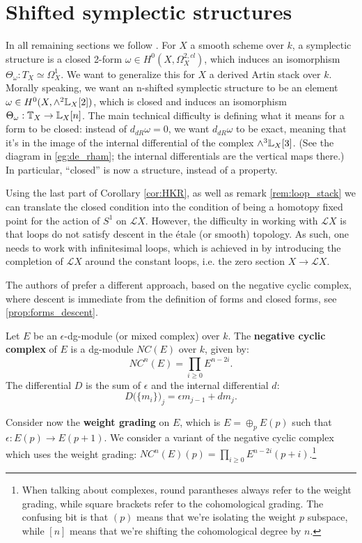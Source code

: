 \section{Shifted symplectic structures}
In all remaining sections we follow \cite{PTVV}. For $X$ a smooth scheme over $k$, a symplectic structure is a closed
2-form
$\omega \in H^0(X,\Omega^{2,cl}_X)$, which induces an isomorphism $\Theta_\omega : T_X \simeq \Omega^1_X$. We want to
generalize this for $X$ a derived Artin stack over $k$. Morally speaking, we want an n-shifted symplectic structure
to be an element $\omega \in H^0(X,\wedge^2\mathbb L_X [2])$, which is closed and induces an isomorphism
$\Theta_\omega : \mathbb T_X \to \mathbb L_X[n]$. The main technical difficulty is defining what it means for a form to be closed:
instead of $d_{dR} \omega = 0$, we want $d_{dR} \omega$ to be exact, meaning that it's in the image of the internal
differential of the complex $\wedge^3\mathbb L_X[3]$. (See the diagram in \ref{eg:de_rham}; the internal differentials are the
vertical maps there.) In particular, ``closed'' is now a structure, instead of a property. 

Using the last part of Corollary \ref{cor:HKR}, as well as remark \ref{rem:loop_stack}
we can translate the closed condition into the condition of being a homotopy fixed point for the action of $S^1$ on $\mathscr{L}X$. 
However, the difficulty in working with $\mathscr{L}X$ is that loops do not satisfy descent in the \'etale (or smooth) topology.
As such, one needs to work with infinitesimal loops, which is achieved in \cite{BZN_loop} by introducing the completion
of $\mathscr{L}X$ around the constant loops, i.e. the zero section $X \to \mathscr{L}X$.

The authors of \cite{PTVV} prefer a different approach, based on the negative cyclic complex, where descent is immediate
from the definition of forms and closed forms, see \ref{prop:forms_descent}.

\begin{defin}
Let $E$ be an $\epsilon$-dg-module (or mixed complex) over $k$. The \textbf{negative cyclic complex} of $E$ is a dg-module $NC(E)$
over $k$, given by:
\[	NC^n(E) = \prod_{i\geq 0} E^{n-2i} .	\]
The differential $D$ is the sum of $\epsilon$ and the internal differential $d$:
\[	D\big(\{m_i\}\big)_j = \epsilon m_{j-1} + d m_j .	\]
\end{defin}

Consider now the \textbf{weight grading} on $E$, which is $E = \oplus_p E(p)$ such that $\epsilon : E(p) \to E(p+1)$.
We consider a variant of the negative cyclic complex which uses the weight grading: $NC^n(E)(p) = \prod_{i\geq 0}
E^{n-2i}(p+i)$.\footnote{When talking about complexes, round parantheses always refer to the weight grading,
while square brackets refer to the cohomological grading. The confusing bit is that $(p)$ means that we're isolating
the weight $p$ subspace, while $[n]$ means that we're shifting the cohomological degree by $n$.}

